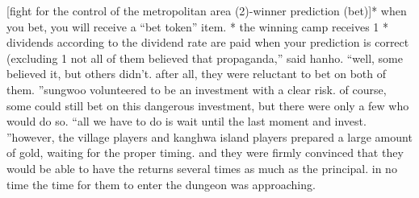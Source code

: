 [fight for the control of the metropolitan area (2)-winner prediction (bet)]* when you bet, you will receive a “bet token” item.
* the winning camp receives 1%
* dividends according to the dividend rate are paid when your prediction is correct (excluding 1%
 not all of them believed that propaganda,” said hanho.
“well, some believed it, but others didn’t.
 after all, they were reluctant to bet on both of them.
”sungwoo volunteered to be an investment with a clear risk.
 of course, some could still bet on this dangerous investment, but there were only a few who would do so.
“all we have to do is wait until the last moment and invest.
”however, the village players and kanghwa island players prepared a large amount of gold, waiting for the proper timing.
 and they were firmly convinced that they would be able to have the returns several times as much as the principal.
in no time the time for them to enter the dungeon was approaching.

